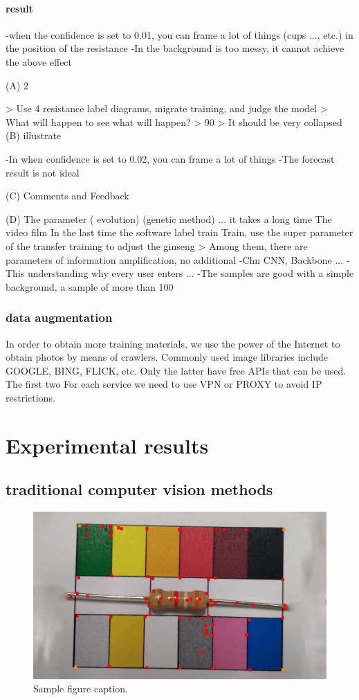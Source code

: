 \documentclass{article}
\begin{document}
\paragraph{result}
-when the confidence is set to 0.01, you can frame a lot of things (cups ..., etc.) in the position of the resistance
-In the background is too messy, it cannot achieve the above effect

(A) 2

> Use 4 resistance label diagrams, migrate training, and judge the model
> What will happen to see what will happen?
> 90%
> It should be very collapsed
(B) illustrate

-In when confidence is set to 0.02, you can frame a lot of things
-The forecast result is not ideal

(C) Comments and Feedback

(D)
The parameter ( evolution) (genetic method) ... it takes a long time
The video film
In the last time the software label train
Train, use the super parameter of the transfer training to adjust the ginseng
> Among them, there are parameters of information amplification, no additional
-Chn CNN, Backbone ...
-This understanding why every user enters ...
-The samples are good with a simple background, a sample of more than 100
\subsubsection{data augmentation}
In order to obtain more training materials, we use the power of the Internet to obtain photos by means of crawlers. Commonly used image libraries include GOOGLE, BING, FLICK, etc. Only the latter have free APIs that can be used. The first two For each service we need to use VPN or PROXY to avoid IP restrictions.
\section{Experimental results}
\subsection{traditional computer vision methods}

\begin{figure}
	\centering
	\includegraphics[width=0.7\linewidth]{marvin.jpg}
	\caption{Sample figure caption.}
	\label{fig:marvin}
\end{figure}
\end{document}
